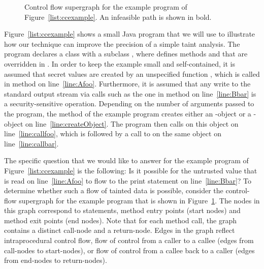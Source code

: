 \begin{figure}
\begin{minipage}{\textwidth}
   \end{minipage}
   \vspace*{-25mm}
  \caption{
    Control flow supergraph for the example program of Figure~\ref{list:ccexample}.
    An infeasible path is shown in bold. 
  }%
  \label{fig:examplesupergraph}%
\end{figure} 
  
Figure~\ref{list:ccexample} shows a small Java program that we will use to illustrate
how our technique can improve the precision of a simple taint analysis. The program
declares a class  with a subclass ,  where  defines methods 
 and  that are overridden in .  In order to keep the 
example small and self-contained, it is assumed  that secret values are created by 
an unspecified function , which is called in method  on 
line~\ref{line:Afoo}. Furthermore, it is assumed that any write to the standard output 
stream via calls  such as the one in method  
on line~\ref{line:Bbar} is a security-sensitive operation. Depending on the number of 
arguments passed to the program, the  method of the example program creates 
either an -object or a -object on line~\ref{line:createObject}. The 
program then calls  on this object on line~\ref{line:callfoo}, which is 
followed by a call to  on the same object on line~\ref{line:callbar}.  
 
The specific question that we would like to answer for the example program of
Figure~\ref{list:ccexample} is the following: Is it possible for the untrusted value 
that is read on line~\ref{line:Afoo} to flow to the print statement on line~\ref{line:Bbar}? 
%
To determine whether such a flow of tainted data is possible, consider the control-flow
supergraph for the example program that is shown in Figure~\ref{fig:examplesupergraph}.
 The nodes in this graph correspond to statements, method entry points (start nodes) and 
method exit points (end nodes). Note that for each method call, the graph contains a 
distinct call-node and a return-node. Edges in the graph reflect intraprocedural control flow, 
flow of control from a caller to a callee (edges from call-nodes to start-nodes), or
flow of control from a callee back to a caller (edges from end-nodes to return-nodes). 

